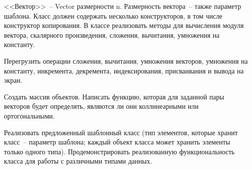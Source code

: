 
<<Вектор>>~-- Vector размерности n. Размерность вектора~-- также параметр шаблона. Класс
должен содержать несколько конструкторов, в том числе конструктор копирования. В
классе реализовать методы для вычисления модуля вектора, скалярного произведения,
сложения, вычитания, умножения на константу.

Перегрузить операции сложения,
вычитания, умножения векторов, умножения на константу, инкремента, декремента,
индексирования, присваивания и вывода на экран.

Создать массив объектов. Написать
функцию, которая для заданной пары векторов будет определять, являются ли они
коллинеарными или ортогональными.

Реализовать предложенный шаблонный класс (тип элементов, которые
хранит класс~-- параметр шаблона; каждый объект класса может хранить
элементы только одного типа). Продемонстрировать реализованную
функциональность класса для работы с различными типами данных.

